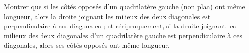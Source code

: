 Montrer que si les côtés opposés d'un quadrilatère gauche (non plan) ont même longueur, alors la droite joignant les milieux des deux diagonales est perpendiculaire à ces diagonales ; et réciproquement, si la droite joignant les milieux des deux diagonales d'un quadrilatère gauche est perpendiculaire à ces diagonales, alors ses côtés opposés ont même longueur.
